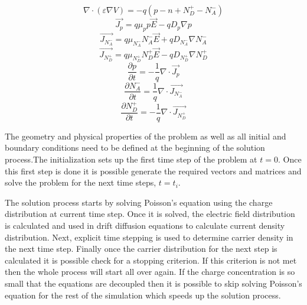 \begin{doublespace}
\begin{equation}
\nabla \cdot  (\varepsilon \nabla V)=-q(p-n+N_{D}^{+}-N_{A}^{-})
\end{equation}
\begin{equation}
\vec{J_p}=q\mu_p p \vec{E}-q D_p \nabla p
\end{equation}
\begin{equation}
\vec{J_{N_{A}^{-}}}=q\mu_{N_{A}^{-}} N_{A}^{-} \vec{E}+q D_{N_{A}^{-}} \nabla N_{A}^{-}
\end{equation}
\begin{equation}
\vec{J_{N_{D}^{+}}}=q\mu_{N_{D}^{+}} N_{D}^{+} \vec{E}-q D_{N_{D}^{+}} \nabla N_{D}^{+}
\end{equation}
\begin{equation}
\frac{\partial p}{\partial t}=-\frac{1}{q}\nabla \cdot \vec{J_p}
\end{equation}
\begin{equation}
\frac{\partial N_{A}^{-}}{\partial t}=\frac{1}{q}\nabla \cdot \vec{J_{N_{A}^{-}}}
\end{equation}
\begin{equation}
\frac{\partial N_{D}^{+}}{\partial t}=-\frac{1}{q}\nabla \cdot \vec{J_{N_{D}^{+}}}
\end{equation}

The geometry and physical properties of the problem as well as all initial and boundary conditions need to be defined at the beginning of the solution process.The initialization sets up the first time step of the problem at $t=0$. Once this first step is done it is possible generate the required vectors and matrices and solve the problem for the next time steps, $t=t_i$. 

The solution process starts by solving Poisson's equation using the charge distribution at current time step. Once it is solved, the electric field distribution is calculated and used in drift diffusion equations to calculate current density distribution. Next, explicit time stepping is used to determine carrier density in the next time step. Finally once the carrier distribution for the next step is calculated it is possible check for a stopping criterion. If this criterion is not met then the whole process will start all over again. If the charge concentration is so small that the equations are decoupled then it is possible to skip solving Poisson's equation for the rest of the simulation which speeds up the solution process.


\end{doublespace}
